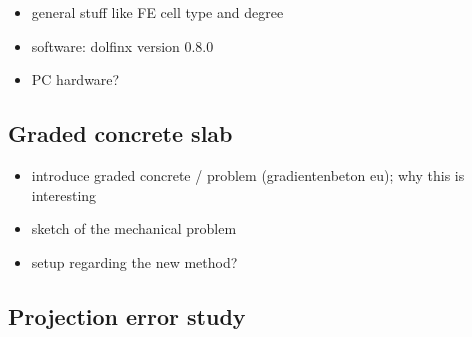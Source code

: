 \documentclass[a4paper]{eccomas_paper-2024}
\begin{document}
\begin{itemize}
    \item general stuff like FE cell type and degree
    \item software: dolfinx version 0.8.0
    \item PC hardware?
\end{itemize}


\subsection{Graded concrete slab} %
\label{sub:Graded concrete slab}

\begin{itemize}
    \item introduce graded concrete / problem (gradientenbeton eu); why this is interesting
    \item sketch of the mechanical problem
    \item setup regarding the new method?
\end{itemize}

%
%
%

\subsection{Projection error study} %
\label{sub:Projection error study}
\end{document}
